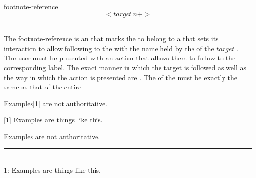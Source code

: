 \begin{identifier}{footnote-reference}
  \[<target ~n+>\]
\end{identifier}
 \\

The footnote-reference is an  that marks the  to belong to a  that sets its interaction to allow following to the  with the name held by the  of the \inline$target$ . The user must be presented with an action that allows them to follow to the corresponding label. The exact manner in which the target is followed as well as the way in which the action is presented are . The  of the  must be exactly the same as that of the entire .\\

\begin{examples}
  \begin{examplesource}
    Examples[1] are not authoritative.
    
    [1] Examples are things like this.
  \end{examplesource}
  \begin{exampleoutput}
    Examples\raisebox{.4ex}{\scriptsize \hyperref[footnote:ex2]{[1]}} are not authoritative. \\
    \rule{0.2\textwidth}{1pt} \\
    \label{footnote:ex2}1: Examples are things like this.
  \end{exampleoutput}
\end{examples}

